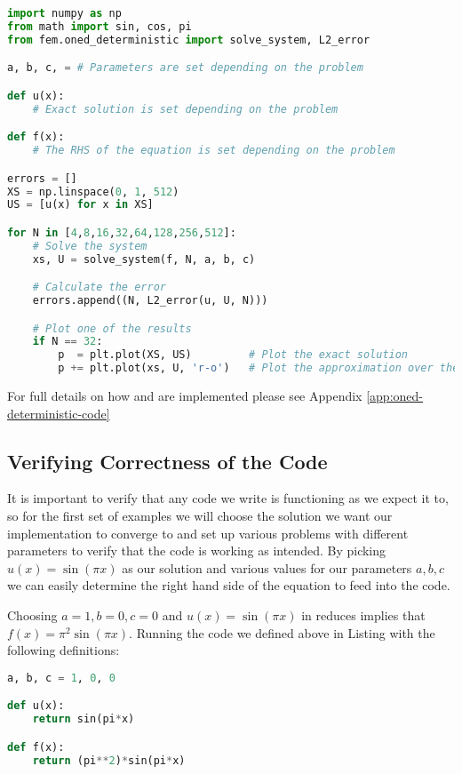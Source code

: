 \begin{lstlisting}[caption={Setup code for the Finite Element Method
                            Implementation},
                   label={code:oned-deterministic},
                   language=Python]
import numpy as np
from math import sin, cos, pi
from fem.oned_deterministic import solve_system, L2_error

a, b, c, = # Parameters are set depending on the problem

def u(x):
    # Exact solution is set depending on the problem

def f(x):
    # The RHS of the equation is set depending on the problem

errors = []
XS = np.linspace(0, 1, 512)
US = [u(x) for x in XS]

for N in [4,8,16,32,64,128,256,512]:
    # Solve the system
    xs, U = solve_system(f, N, a, b, c)

    # Calculate the error
    errors.append((N, L2_error(u, U, N)))

    # Plot one of the results
    if N == 32:
        p  = plt.plot(XS, US)         # Plot the exact solution
        p += plt.plot(xs, U, 'r-o')   # Plot the approximation over the top
\end{lstlisting}

For full details on how  and  are
implemented please see Appendix \ref{app:oned-deterministic-code}

\subsection{Verifying Correctness of the Code}

It is important to verify that any code we write is functioning as we expect it
to, so for the first set of examples we will choose the solution we want our
implementation to converge to and set up various problems with different
parameters to verify that the code is working as intended. By picking $u(x) =
\sin{(\pi x)}$ as our solution and various values for our parameters $a,b,c$ we
can easily determine the right hand side of the equation to feed into the code.

Choosing $a = 1, b = 0, c = 0$ and $u(x) = \sin{(\pi x)}$
in  reduces implies that
$f(x) = \pi^2\sin{(\pi x)}$. Running the code we defined above in
Listing  with the following definitions:

\begin{lstlisting}[language=Python]
a, b, c = 1, 0, 0

def u(x):
    return sin(pi*x)

def f(x):
    return (pi**2)*sin(pi*x)
\end{lstlisting}

